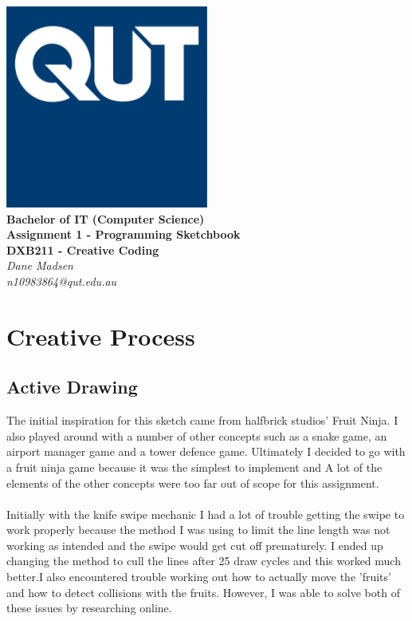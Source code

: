 \documentclass[12pt,a4paper]{article}
\begin{document}
	\begin{titlepage}
		\begin{center}
			\includegraphics[width=0.5\textwidth]{QUT.jpg}\\
			[0.03\textheight]  
			\Large\textbf{Bachelor of IT (Computer Science)}\\
			\Large\textbf{Assignment 1 - Programming Sketchbook}\\
			\large\textbf{DXB211 - Creative Coding}\\
			[0.02\textheight]
			\large\textsl{Dane Madsen}\\
			\large\textsl{n10983864@qut.edu.au}
		\end{center}
		
	\end{titlepage}

	\section{Creative Process}
		\subsection{Active Drawing}
			The initial inspiration for this sketch came from halfbrick studios' Fruit Ninja.
			I also played around with a number of other concepts such as a snake game, an airport 
			manager game and a tower defence game. Ultimately I decided to go with a fruit ninja 
			game because it was the simplest to implement and A lot of the elements of the other 
			concepts were too far out of scope for this assignment.\\\\Initially with the knife 
			swipe mechanic I had a lot of trouble getting the swipe to work properly because the 
			method I was using to limit the line length was not working as intended and the swipe 
			would get cut off prematurely. I ended up changing the method to cull the lines after 
			25 draw cycles and this worked much better.I also encountered trouble working out 
			how to actually move the 'fruits' and how to detect collisions with the fruits. However, 
			I was able to solve both of these issues by researching online.
		
\end{document}
